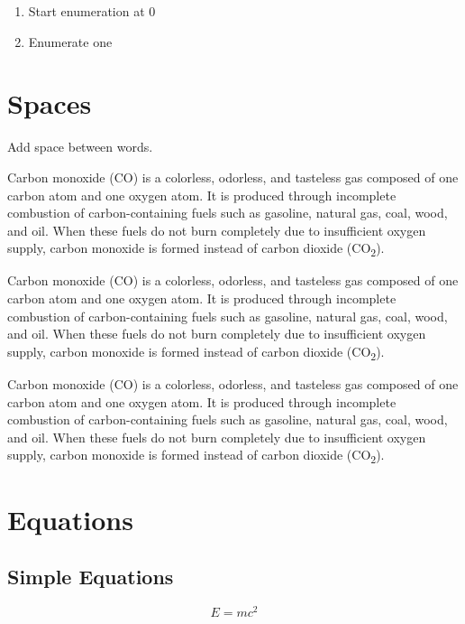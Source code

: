 \documentclass{article} %
\begin{document}
\begin{enumerate}\setcounter{enumi}{0}
    \item Start enumeration at 0
    \item Enumerate one
\end{enumerate}

\section{Spaces}

Add space between \quad words.

Carbon monoxide (CO) is a colorless, odorless, and tasteless gas composed of one carbon atom and one oxygen atom. It is produced through incomplete combustion of carbon-containing fuels such as gasoline, natural gas, coal, wood, and oil. When these fuels do not burn completely due to insufficient oxygen supply, carbon monoxide is formed instead of carbon dioxide (CO\textsubscript{2}).

\begin{spacing}{0.8} 
Carbon monoxide (CO) is a colorless, odorless, and tasteless gas composed of one carbon atom and one oxygen atom. It is produced through incomplete combustion of carbon-containing fuels such as gasoline, natural gas, coal, wood, and oil. When these fuels do not burn completely due to insufficient oxygen supply, carbon monoxide is formed instead of carbon dioxide (CO\textsubscript{2}).
\end{spacing}

\begin{spacing}{1.5} 
Carbon monoxide (CO) is a colorless, odorless, and tasteless gas composed of one carbon atom and one oxygen atom. It is produced through incomplete combustion of carbon-containing fuels such as gasoline, natural gas, coal, wood, and oil. When these fuels do not burn completely due to insufficient oxygen supply, carbon monoxide is formed instead of carbon dioxide (CO\textsubscript{2}).
\end{spacing}

\section{Equations}

\subsection{Simple Equations}

\begin{equation}
    E=mc^2
\end{equation}
\end{document}
